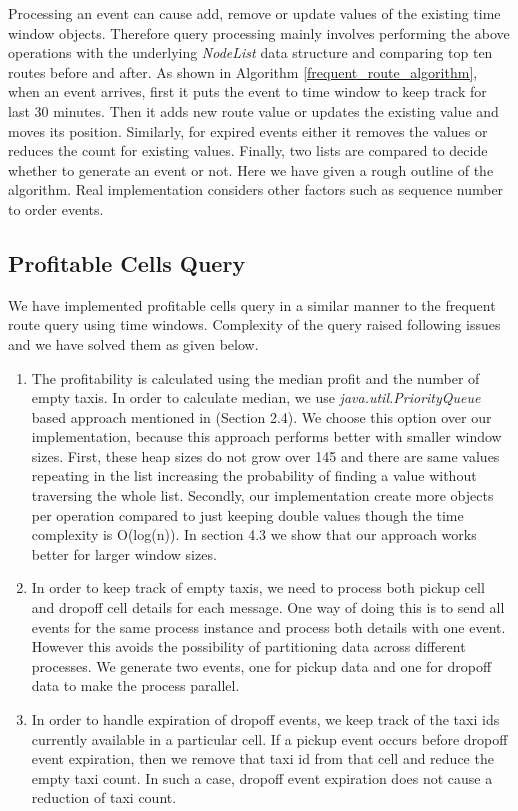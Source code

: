 Processing an event can cause add, remove or update values of the existing time window objects. Therefore query processing mainly involves performing the above operations with the underlying \textit{NodeList} data structure and comparing top ten routes before and after. As shown in Algorithm \ref{frequent_route_algorithm}, when an event arrives, first it puts the event to time window to keep track for last 30 minutes. Then it adds new route value or updates the existing value and moves its position. Similarly, for expired events either it removes the values or reduces the count for existing values. Finally, two lists are compared to decide whether to generate an event or not. Here we have given a rough outline of the algorithm. Real implementation considers other factors such as sequence number to order events.

\subsection{Profitable Cells Query}

We have implemented profitable cells query in a similar manner to the frequent route query using  time windows. Complexity of the query raised following issues and we have solved them as given below.
\begin{enumerate}
	\item The profitability is calculated using the median profit and the number of empty taxis. In order to calculate median, we use \textit{java.util.PriorityQueue} based approach mentioned in (Section 2.4). We choose this option over our implementation, because this approach performs better with smaller window sizes. First, these heap sizes do not grow over 145 and there are same values repeating in the list increasing the probability of finding a value without traversing the whole list. Secondly, our implementation create more objects per operation compared to just keeping double values though the time complexity is O(log(n)). In section 4.3 we show that our approach works better for larger window sizes.
	\item In order to keep track of empty taxis, we need to process both pickup cell and dropoff cell details for each message. One way of doing this is to send all events for the same process instance and process both details with one event. However this avoids the possibility of partitioning data across different processes. We generate two events, one for pickup data and one for dropoff data to make the process parallel. 
	\item In order to handle expiration of dropoff events, we keep track of the taxi ids currently available in a particular cell. If a pickup event occurs before dropoff event expiration, then we remove that taxi id from that cell and reduce the empty taxi count. In such a case, dropoff event expiration does not cause a reduction of taxi count.
\end{enumerate}

